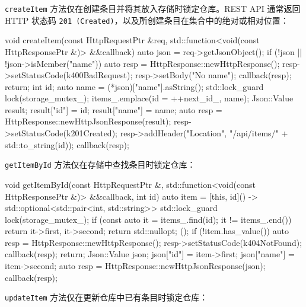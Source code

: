 \texttt{create\allowbreak{}Item} 方法仅在创建条目并将其放入存储时锁定仓库。REST API 通常返回 HTTP 状态码 \texttt{201 (\allowbreak{}Created)\allowbreak{}}，以及所创建条目在集合中的绝对或相对位置：

\begin{codebox}[cpp]
  void createItem(const HttpRequestPtr &req,
                  std::function<void(const HttpResponsePtr &)> &&callback) {
    auto json = req->getJsonObject();
    if (!json || !json->isMember("name")) {
      auto resp = HttpResponse::newHttpResponse();
      resp->setStatusCode(k400BadRequest);
      resp->setBody("No name");
      callback(resp);
      return;
    }
    int id;
    auto name = (*json)["name"].asString();
    {
      std::lock_guard lock(storage_mutex_);
      items_.emplace(id = ++next_id_, name);
    }
    Json::Value result;
    result["id"] = id;
    result["name"] = name;
    auto resp = HttpResponse::newHttpJsonResponse(result);
    resp->setStatusCode(k201Created);
    resp->addHeader("Location", "/api/items/" + std::to_string(id));
    callback(resp);
  }
\end{codebox}

\texttt{get\allowbreak{}Item\allowbreak{}By\allowbreak{}Id} 方法仅在存储中查找条目时锁定仓库：

\begin{codebox}[cpp]
  void getItemById(const HttpRequestPtr &,
                   std::function<void(const HttpResponsePtr &)> &&callback,
                   int id) {
    auto item = [this, id]() -> std::optional<std::pair<int, std::string>> {
      std::lock_guard lock(storage_mutex_);
      if (const auto it = items_.find(id); it != items_.end()) {
        return {{it->first, it->second}};
      }
      return std::nullopt;
    }();
    if (!item.has_value()) {
      auto resp = HttpResponse::newHttpResponse();
      resp->setStatusCode(k404NotFound);
      callback(resp);
      return;
    }
    Json::Value json;
    json["id"] = item->first;
    json["name"] = item->second;
    auto resp = HttpResponse::newHttpJsonResponse(json);
    callback(resp);
  }
\end{codebox}

\label{idx:1633}
\texttt{update\allowbreak{}Item} 方法仅在更新仓库中已有条目时锁定仓库：

